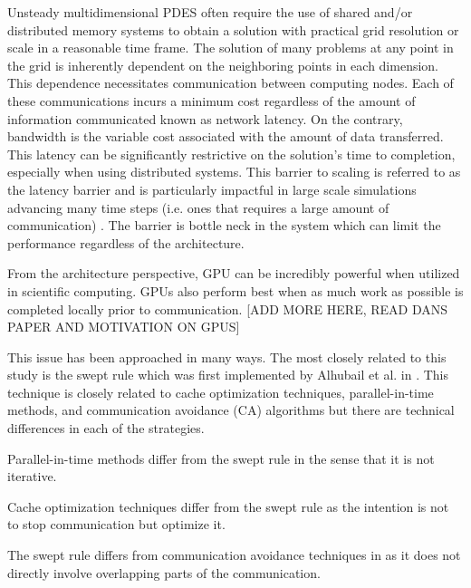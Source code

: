 \documentclass[review]{elsarticle}
\begin{document}
Unsteady multidimensional PDES often require the use of shared and/or distributed memory systems to obtain a solution with practical grid resolution or scale in a reasonable time frame. The solution of many problems at any point in the grid is inherently dependent on the neighboring points in each dimension. This dependence necessitates communication between computing nodes. Each of these communications incurs a minimum cost regardless of the amount of information communicated known as network latency. On the contrary, bandwidth is the variable cost associated with the amount of data transferred. This latency can be significantly restrictive on the solution's time to completion, especially when using distributed systems. This barrier to scaling is referred to as the latency barrier and is particularly impactful in large scale simulations advancing many time steps (i.e. ones that requires a large amount of communication) \cite{alhubail1D}. The barrier is bottle neck in the system which can limit the performance regardless of the architecture.

\par
From the architecture perspective, GPU can be incredibly powerful when utilized in scientific computing. GPUs also perform best when as much work as possible is completed locally prior to communication. [ADD MORE HERE, READ DANS PAPER AND MOTIVATION ON GPUS]

\par This issue has been approached in many ways. The most closely related to this study is the swept rule which was first implemented by Alhubail et al. in \cite{alhubail1D}. This technique is closely related to cache optimization techniques, parallel-in-time methods, and communication avoidance (CA) algorithms but there are technical differences in each of the strategies.

\par
Parallel-in-time methods differ from the swept rule in the sense that it is not iterative.

\par
Cache optimization techniques differ from the swept rule as the intention is not to stop communication but optimize it.

\par
The swept rule differs from communication avoidance techniques in as it does not directly involve overlapping parts of the communication.
\end{document}
